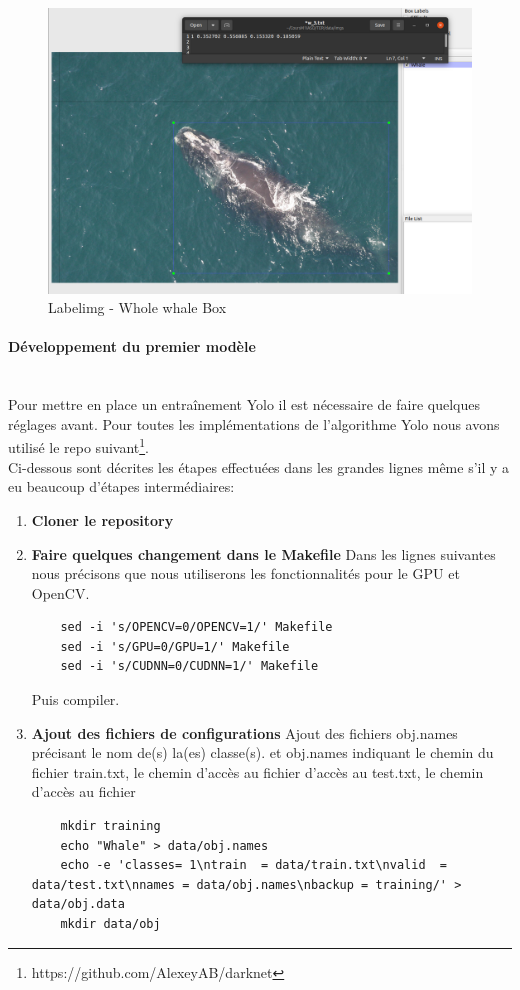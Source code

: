 \documentclass[12pt,a4paper]{report}
\begin{document}
\begin{spacing}{1.5}
\begin{figure}[H]
\begin{center}
\includegraphics[scale=0.4]{figures/labelimg.png}
\caption{Labelimg - Whole whale Box}
\end{center}
\end{figure}

\paragraph{Développement du premier modèle} 
\\
Pour mettre en place un entraînement Yolo il est nécessaire de faire quelques réglages avant. Pour toutes les implémentations de l’algorithme Yolo nous avons utilisé le repo suivant\footnote{https://github.com/AlexeyAB/darknet}.
\\
Ci-dessous sont décrites les étapes effectuées dans les grandes lignes même s'il y a eu beaucoup d'étapes intermédiaires:

\begin{enumerate}
    \item \textbf{Cloner le repository}
    \item \textbf{Faire quelques changement dans le Makefile}
    Dans les lignes suivantes nous précisons que nous utiliserons les fonctionnalités pour le GPU et OpenCV.
    \begin{lstlisting}
    sed -i 's/OPENCV=0/OPENCV=1/' Makefile
    sed -i 's/GPU=0/GPU=1/' Makefile
    sed -i 's/CUDNN=0/CUDNN=1/' Makefile
    \end{lstlisting}
    Puis compiler.
    
    \item \textbf{Ajout des fichiers de configurations}
    Ajout des fichiers obj.names précisant le nom de(s) la(es) classe(s). et obj.names indiquant le chemin du fichier train.txt, le chemin d'accès au fichier d'accès au test.txt, le chemin d'accès au fichier 
    \begin{lstlisting}
    mkdir training
    echo "Whale" > data/obj.names
    echo -e 'classes= 1\ntrain  = data/train.txt\nvalid  = data/test.txt\nnames = data/obj.names\nbackup = training/' > data/obj.data
    mkdir data/obj
    \end{lstlisting}
    

\end{enumerate}
\end{spacing}
\end{document}
